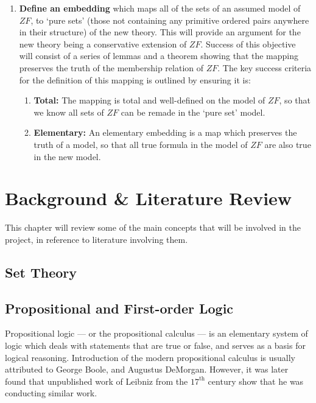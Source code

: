 \documentclass[11pt]{report}
\theoremstyle{definition}
\theoremstyle{theorem}
\theoremstyle{lemma}
\begin{document}
\begin{enumerate}
  \item \textbf{Define an embedding} which maps all of the sets of an assumed model of $\mathit{ZF}$, to `pure sets' (those not containing any primitive ordered pairs anywhere in their structure) of the new theory. 
  This will provide an argument for the new theory being a conservative extension of $\mathit{ZF}$.
  Success of this objective will consist of a series of lemmas and a theorem showing that the mapping preserves the truth of the membership relation of $\mathit{ZF}$. 
  The key success criteria for the definition of this mapping is outlined by ensuring it is:
  \begin{enumerate}
    \item \textbf{Total:} The mapping is total and well-defined on the model of $\mathit{ZF}$, so that we know all sets of $\mathit{ZF}$ can be remade in the `pure set' model. 
    \item \textbf{Elementary:} An elementary embedding is a map which preserves the truth of a model, so that all true formula in the model of $\mathit{ZF}$ are also true in the new model.   
  \end{enumerate} 
\end{enumerate}


\chapter{Background \& Literature Review}
This chapter will review some of the main concepts that will be involved in the project, in reference to literature involving them.

\section{Set Theory}


\section{Propositional and First-order Logic}
Propositional logic --- or the propositional calculus --- is an elementary system of logic which deals with statements that are true or false, and serves as a basis for logical reasoning. 
Introduction of the modern propositional calculus is usually attributed to George Boole, and Augustus DeMorgan. 
However, it was later found that unpublished work of Leibniz from the $17^{\text{th}}$ century show that he was conducting similar work.
\end{document}
